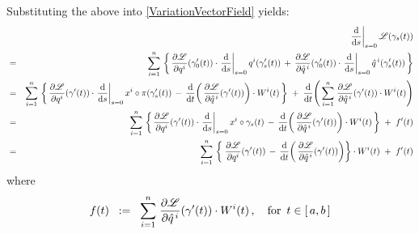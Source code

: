 Substituting the above into \eqref{VariationVectorField} yields:
\begin{eqnarray*}
&&
	\left.\dfrac{\d}{\d s}\right\vert_{s=0} \mathscr{L}\!\left(\gamma_{s}(t)\right)
\\
& = &
	\overset{n}{\underset{i=1}{\sum}}\,\left\{\,
		\dfrac{\partial\mathscr{L}}{\partial q^{i}}\!\left(\gamma^{\prime}_{0}(t)\right)
		\cdot
		\left.\dfrac{\d}{\d s}\right\vert_{s=0} q^{i}(\gamma^{\prime}_{s}(t))
		\, + \,
		\dfrac{\partial\mathscr{L}}{\partial\hat{q}^{\,i}}\!\left(\gamma^{\prime}_{0}(t)\right)
		\cdot
		\left.\dfrac{\d}{\d s}\right\vert_{s=0} \hat{q}^{\,i}(\gamma^{\prime}_{s}(t))
		\,\right\}
\\
& = &
	\overset{n}{\underset{i=1}{\sum}}\,\left\{\,
		\dfrac{\partial\mathscr{L}}{\partial q^{i}}\!\left(\gamma^{\prime}(t)\right)
		\cdot
		\left.\dfrac{\d}{\d s}\right\vert_{s=0} x^{i}\circ\pi(\gamma^{\prime}_{s}(t))
		\, - \,
		\dfrac{\d}{\d t}\!\left(\,
			\dfrac{\partial\mathscr{L}}{\partial\hat{q}^{\,i}}\!\left(\gamma^{\prime}(t)\right)
			\right)	
		\cdot
		W^{i}(t)
		\,\right\}
	\; + \;
	\dfrac{\d}{\d t}\!\left(\,
		\overset{n}{\underset{i=1}{\sum}}\;
		\dfrac{\partial\mathscr{L}}{\partial\hat{q}^{\,i}}\!\left(\gamma^{\prime}(t)\right)
		\cdot
		W^{i}(t)
		\right)
\\
& = &
	\overset{n}{\underset{i=1}{\sum}}\,\left\{\,
		\dfrac{\partial\mathscr{L}}{\partial q^{i}}\!\left(\gamma^{\prime}(t)\right)
		\cdot
		\left.\dfrac{\d}{\d s}\right\vert_{s=0} x^{i}\circ\gamma_{s}(t)
		\, - \,
		\dfrac{\d}{\d t}\!\left(\,
			\dfrac{\partial\mathscr{L}}{\partial\hat{q}^{\,i}}\!\left(\gamma^{\prime}(t)\right)
			\right)	
		\cdot
		W^{i}(t)
		\,\right\}
	\; + \;
	f^{\prime}(t)
\\
& = &
	\overset{n}{\underset{i=1}{\sum}}\,\left\{\;
		\dfrac{\partial\mathscr{L}}{\partial q^{i}}\!\left(\gamma^{\prime}(t)\right)
		\, - \,
		\dfrac{\d}{\d t}\!\left(\,
			\dfrac{\partial\mathscr{L}}{\partial\hat{q}^{\,i}}\!\left(\gamma^{\prime}(t)\right)
			\right)
		\right\}
	\cdot
	W^{i}(t)
	\; + \;
	f^{\prime}(t)
\end{eqnarray*}
where
\begin{equation*}
f(t)
\;\; := \;\;
	\overset{n}{\underset{i=1}{\sum}}\;
	\dfrac{\partial\mathscr{L}}{\partial\hat{q}^{\,i}}\!\left(\gamma^{\prime}(t)\right)
	\cdot
	W^{i}(t)\,,
\quad
\textnormal{for \,$t \in [\,a,b\,]$}
\end{equation*}

